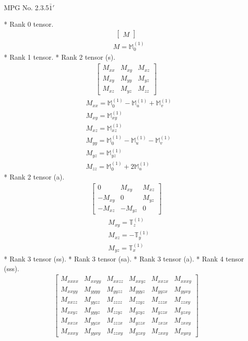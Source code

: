\documentclass[fleqn,8pt,landscape]{jsarticle}
\begin{document}
\setcounter{MaxMatrixCols}{32}

\renewcommand{\tablename}{Table~}
\renewcommand{\figurename}{Figure~}
\begin{center}
\LARGE
MPG No. 2.3.5\quad$\bar{1}'$
\end{center}
* Rank 0 tensor.
\begin{align*}
\begin{bmatrix} M \end{bmatrix}
\end{align*}
\begin{align*}
& M = \mathbb{M}_{0}^{(1)}
\end{align*}
* Rank 1 tensor.
* Rank 2 tensor (s).
\begin{align*}
\begin{bmatrix} M_{xx} & M_{xy} & M_{xz} \\ M_{xy} & M_{yy} & M_{yz} \\ M_{xz} & M_{yz} & M_{zz} \end{bmatrix}
\end{align*}
\begin{align*}
& M_{xx} = \mathbb{M}_{0}^{(1)} - \mathbb{M}_{u}^{(1)} + \mathbb{M}_{v}^{(1)} \\
& M_{xy} = \mathbb{M}_{xy}^{(1)} \\
& M_{xz} = \mathbb{M}_{xz}^{(1)} \\
& M_{yy} = \mathbb{M}_{0}^{(1)} - \mathbb{M}_{u}^{(1)} - \mathbb{M}_{v}^{(1)} \\
& M_{yz} = \mathbb{M}_{yz}^{(1)} \\
& M_{zz} = \mathbb{M}_{0}^{(1)} + 2 \mathbb{M}_{u}^{(1)}
\end{align*}
* Rank 2 tensor (a).
\begin{align*}
\begin{bmatrix} 0 & M_{xy} & M_{xz} \\ - M_{xy} & 0 & M_{yz} \\ - M_{xz} & - M_{yz} & 0 \end{bmatrix}
\end{align*}
\begin{align*}
& M_{xy} = \mathbb{T}_{z}^{(1)} \\
& M_{xz} = - \mathbb{T}_{y}^{(1)} \\
& M_{yz} = \mathbb{T}_{x}^{(1)}
\end{align*}
* Rank 3 tensor (ss).
* Rank 3 tensor (sa).
* Rank 3 tensor (a).
* Rank 4 tensor (sss).
\begin{align*}
\begin{bmatrix} M_{xxxx} & M_{xxyy} & M_{xxzz} & M_{xxyz} & M_{xxzx} & M_{xxxy} \\ M_{xxyy} & M_{yyyy} & M_{yyzz} & M_{yyyz} & M_{yyzx} & M_{yyxy} \\ M_{xxzz} & M_{yyzz} & M_{zzzz} & M_{zzyz} & M_{zzzx} & M_{zzxy} \\ M_{xxyz} & M_{yyyz} & M_{zzyz} & M_{yzyz} & M_{yzzx} & M_{yzxy} \\ M_{xxzx} & M_{yyzx} & M_{zzzx} & M_{yzzx} & M_{zxzx} & M_{zxxy} \\ M_{xxxy} & M_{yyxy} & M_{zzxy} & M_{yzxy} & M_{zxxy} & M_{xyxy} \end{bmatrix}
\end{align*}
\end{document}
